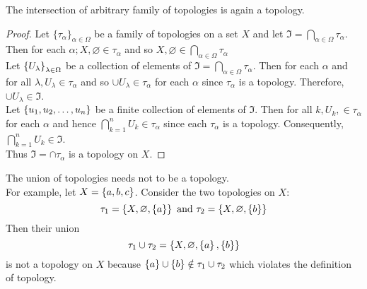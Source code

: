 \documentclass[../main-sheet.tex]{subfiles}
\begin{document}
\begin{thm}
    The intersection of arbitrary family of topologies is again a topology.
\end{thm}
\begin{proof}
    Let  \(\{\tau_\alpha\}_{\alpha\in \Omega}\) be a family of topologies on a set  \(X\) and let  \(\Im =\bigcap_{\alpha\in \Omega} \tau_\alpha\). Then for each  \(\alpha; X,\varnothing\in\tau_\alpha\) and so  \(X,\varnothing\in \bigcap_{\alpha\in \Omega}\tau_\alpha\)\\
    Let  \(\left\{U_\lambda\right\}_{\lambda\in\Omega}\) be a collection of elements of  \(\Im =\bigcap_{\alpha\in\Omega}\tau_\alpha\). Then for each  \(\alpha\) and for all  \(\lambda, U_\lambda \in \tau_\alpha\) and so  \(\cup U_\lambda \in\tau_\alpha\) for each  \(\alpha\) since  \(\tau_\alpha\) is a topology. Therefore,  \(\cup U_\lambda\in\Im\).\\
    Let  \(\left\{u_1,u_2,\dots,u_n\right\}\) be a finite collection of elements of  \(\Im\).
    Then for all  \(k, U_k, \in\tau_\alpha\) for each  \(\alpha\) and hence  \(\bigcap_{k=1}^n U_k\in\tau_\alpha\) since each  \(\tau_\alpha\) is a topology. Consequently,  \(\bigcap_{k=1}^nU_k\in\Im\).\\
    Thus  \(\Im=\cap \tau_\alpha\) is a topology on  \(X\).
\end{proof}
\begin{rem}
    The union of topologies needs not to be a topology.\\
    For example, let  \(X = \left\{a,b,c\right\}\).
    Consider the two topologies on  \(X\):
    \[
        \tau_1 = \left\{X, \varnothing, \left\{a\right\}\right\} \text{ and } \tau_2 = \left\{X, \varnothing, \left\{b\right\}\right\}
    \]
    Then their union
    \[
        \tau_1 \cup \tau_2 = \left\{X, \varnothing, \left\{a\right\}, \left\{b\right\}\right\}
    \]
    is not a topology on  \(X\) because  \(\left\{a\right\} \cup \left\{b\right\} \notin \tau_1 \cup \tau_2\) which violates the definition of topology.
\end{rem}
\end{document}
